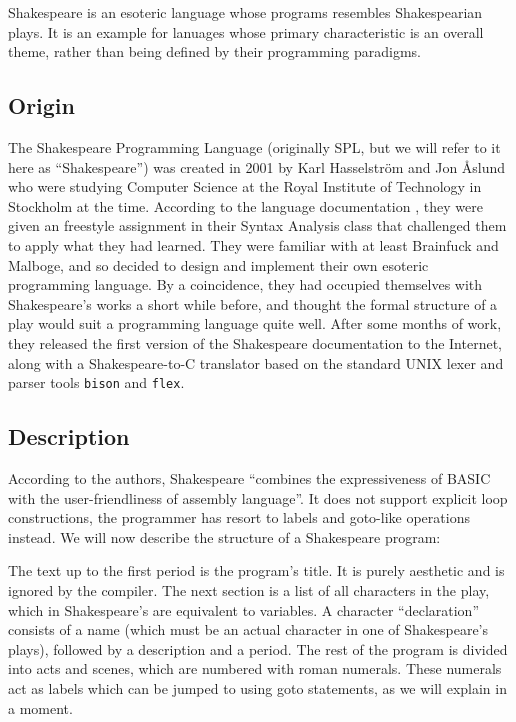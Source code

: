 Shakespeare is an esoteric language whose programs resembles Shakespearian plays. It is an example for lanuages whose primary characteristic is an overall theme, rather than being defined by their programming paradigms.

\subsection{Origin}

The Shakespeare Programming Language (originally SPL, but we will refer to it here as “Shakespeare”) was created in 2001 by Karl Hasselström and Jon Åslund who were studying Computer Science at the Royal Institute of Technology in Stockholm at the time. According to the language documentation \cite{hasselstrom2001shakespeare}, they were given an freestyle assignment in their Syntax Analysis class that challenged them to apply what they had learned. They were familiar with at least Brainfuck and Malboge, and so decided to design and implement their own esoteric programming language. By a coincidence, they had occupied themselves with Shakespeare's works a short while before, and thought the formal structure of a play would suit a programming language quite well. After some months of work, they released the first version of the Shakespeare documentation to the Internet, along with a Shakespeare-to-C translator based on the standard UNIX lexer and parser tools \texttt{bison} and \texttt{flex}.

\subsection{Description}

According to the authors, Shakespeare “combines the expressiveness of BASIC with the user-friendliness of assembly language”. It does not support explicit loop constructions, the programmer has resort to labels and goto-like operations instead. We will now describe the structure of a Shakespeare program:

The text up to the first period is the program's title. It is purely aesthetic and is ignored by the compiler. The next section is a list of all characters in the play, which in Shakespeare's are equivalent to variables. A character “declaration” consists of a name (which must be an actual character in one of Shakespeare's plays), followed by a description and a period. The rest of the program is divided into acts and scenes, which are numbered with roman numerals. These numerals act as labels which can be jumped to using goto statements, as we will explain in a moment.

